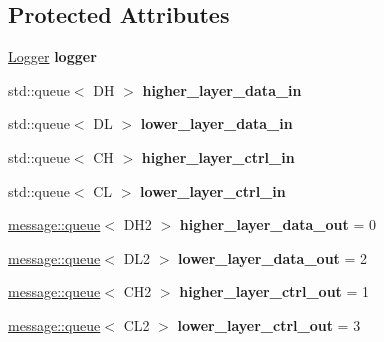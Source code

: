 \subsection*{Protected Attributes}
\begin{DoxyCompactItemize}
\item 
\hyperlink{classLogger}{Logger} {\bfseries logger}\hypertarget{classLayer_a537a1e57d0e9b69c857a89372e43e8c8}{}\label{classLayer_a537a1e57d0e9b69c857a89372e43e8c8}

\item 
std\+::queue$<$ DH $>$ {\bfseries higher\+\_\+layer\+\_\+data\+\_\+in}\hypertarget{classLayer_a087dc6b9f1a13ab134ec21bbcca1613a}{}\label{classLayer_a087dc6b9f1a13ab134ec21bbcca1613a}

\item 
std\+::queue$<$ DL $>$ {\bfseries lower\+\_\+layer\+\_\+data\+\_\+in}\hypertarget{classLayer_adb48b09eff4b15662593a8e5d6c937da}{}\label{classLayer_adb48b09eff4b15662593a8e5d6c937da}

\item 
std\+::queue$<$ CH $>$ {\bfseries higher\+\_\+layer\+\_\+ctrl\+\_\+in}\hypertarget{classLayer_a2ad38a89f17ce5ce6027cf9847f42f04}{}\label{classLayer_a2ad38a89f17ce5ce6027cf9847f42f04}

\item 
std\+::queue$<$ CL $>$ {\bfseries lower\+\_\+layer\+\_\+ctrl\+\_\+in}\hypertarget{classLayer_ac4cd7792653eab48d3b01a087ae9069a}{}\label{classLayer_ac4cd7792653eab48d3b01a087ae9069a}

\item 
\hyperlink{classmessage_1_1queue}{message\+::queue}$<$ D\+H2 $>$ {\bfseries higher\+\_\+layer\+\_\+data\+\_\+out} = 0\hypertarget{classLayer_a0695544b96e2e6f4473838d1ce79acea}{}\label{classLayer_a0695544b96e2e6f4473838d1ce79acea}

\item 
\hyperlink{classmessage_1_1queue}{message\+::queue}$<$ D\+L2 $>$ {\bfseries lower\+\_\+layer\+\_\+data\+\_\+out} = 2\hypertarget{classLayer_aed13b723a43c0e7e3e05cf9c25eef0ff}{}\label{classLayer_aed13b723a43c0e7e3e05cf9c25eef0ff}

\item 
\hyperlink{classmessage_1_1queue}{message\+::queue}$<$ C\+H2 $>$ {\bfseries higher\+\_\+layer\+\_\+ctrl\+\_\+out} = 1\hypertarget{classLayer_a135be5c42313bff23a18d1cda136f495}{}\label{classLayer_a135be5c42313bff23a18d1cda136f495}

\item 
\hyperlink{classmessage_1_1queue}{message\+::queue}$<$ C\+L2 $>$ {\bfseries lower\+\_\+layer\+\_\+ctrl\+\_\+out} = 3\hypertarget{classLayer_a5fdb4f5acc54930faa871a4fdc6ce688}{}\label{classLayer_a5fdb4f5acc54930faa871a4fdc6ce688}


\end{DoxyCompactItemize}
